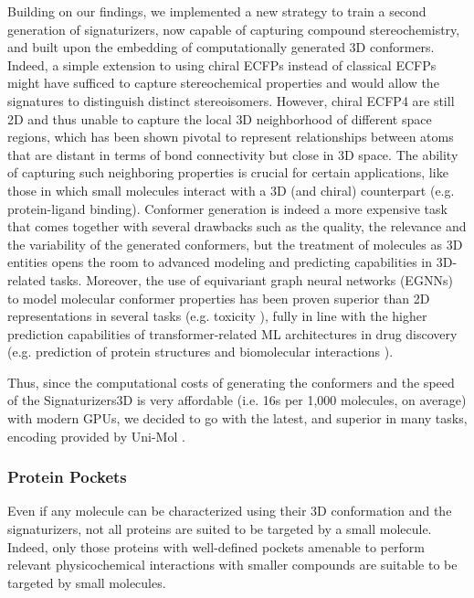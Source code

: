 Building on our findings, we implemented a new strategy to train a second generation of signaturizers, now capable of capturing compound stereochemistry, and built upon the embedding of computationally generated 3D conformers. Indeed, a simple extension to using chiral ECFPs instead of classical ECFPs might have sufficed to capture stereochemical properties and would allow the signatures to distinguish distinct stereoisomers. However, chiral ECFP4 are still 2D and thus unable to capture the local 3D neighborhood of different space regions, which has been shown pivotal to represent relationships between atoms that are distant in terms of bond connectivity but close in 3D space\cite{axen_simple_2017}. The ability of capturing such neighboring properties is crucial for certain applications, like those in which small molecules interact with a 3D (and chiral) counterpart (e.g. protein-ligand binding). Conformer generation is indeed a more expensive task that comes together with several drawbacks such as the quality, the relevance and the variability of the generated conformers, but the treatment of molecules as 3D entities opens the room to advanced modeling and predicting capabilities in 3D-related tasks. Moreover, the use of equivariant graph neural networks (EGNNs) to model molecular conformer properties has been proven superior than 2D representations in several tasks (e.g. toxicity \cite{cremer_equivariant_2023}), fully in line with the higher prediction capabilities of transformer-related ML architectures in drug discovery (e.g. prediction of protein structures and biomolecular interactions \cite{jumper_highly_2021, abramson_accurate_2024}).

Thus, since the computational costs of generating the conformers and the speed of the Signaturizers3D is very affordable (i.e. 16s per 1,000 molecules, on average) with modern GPUs, we decided to go with the latest, and superior in many tasks, encoding provided by Uni-Mol \cite{zhou_uni-mol_2022}. 

\subsubsection{Protein Pockets}

Even if any molecule can be characterized using their 3D conformation and the signaturizers, not all proteins are suited to be targeted by a small molecule. Indeed, only those proteins with well-defined pockets amenable to perform relevant physicochemical interactions with smaller compounds are suitable to be targeted by small molecules. 

